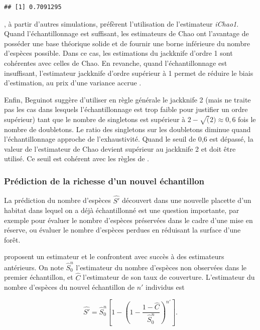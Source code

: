 \documentclass[
  11pt,
  french,
  a4paper,
  extrafontsizes,onecolumn,openright
  ]{memoir}
\newlength{\rf}
\begin{document}
\begin{verbatim}
## [1] 0.7091295
\end{verbatim}

\normalsize

\textcite{Chiu2014a}, à partir d'autres simulations, préfèrent l'utilisation de l'estimateur \emph{iChao1}.
Quand l'échantillonnage est suffisant, les estimateurs de Chao ont l'avantage de posséder une base théorique solide et de fournir une borne inférieure du nombre d'espèces possible.
Dans ce cas, les estimations du jackknife d'ordre 1 sont cohérentes avec celles de Chao.
En revanche, quand l'échantillonnage est insuffisant, l'estimateur jackknife d'ordre supérieur à 1 permet de réduire le biais d'estimation, au prix d'une variance accrue \autocite{Marcon2015a}.

Enfin, Beguinot \autocite*{Beguinot2015a,Beguinot2016} suggère d'utiliser en règle générale le jackknife 2 (mais ne traite pas les cas dans lesquels l'échantillonnage est trop faible pour justifier un ordre supérieur) tant que le nombre de singletons est supérieur à \(2-\sqrt(2) \approx 0,6\) fois le nombre de doubletons.
Le ratio des singletons sur les doubletons diminue quand l'échantillonnage approche de l'exhaustivité.
Quand le seuil de 0,6 est dépassé, la valeur de l'estimateur de Chao devient supérieur au jackknife 2 et doit être utilisé.
Ce seuil est cohérent avec les règles de \textcite{Brose2003}.

\subsubsection{Prédiction de la richesse d'un nouvel échantillon}\label{sec-Extrapol}

La prédiction du nombre d'espèces \(\hat{S'}\) découvert dans une nouvelle placette d'un habitat dans lequel on a déjà échantillonné est une question importante, par exemple pour évaluer le nombre d'espèces préservées dans le cadre d'une mise en réserve, ou évaluer le nombre d'espèces perdues en réduisant la surface d'une forêt.

\textcite{Shen2003} proposent un estimateur et le confrontent avec succès à des estimateurs antérieurs.
On note \(\hat{S}^{n}_{0}\) l'estimateur du nombre d'espèces non observées dans le premier échantillon, et \(\hat{C}\) l'estimateur de son taux de couverture.
L'estimateur du nombre d'espèces du nouvel échantillon de \(n'\) individus est

\begin{equation}
  \hat{S'} = \hat{S}^{n}_{0} \left[1-{\left(1-\frac{1-\hat{C}}{\hat{S}^{n}_{0}}\right)}^{n'}\right].
\end{equation}
\end{document}
